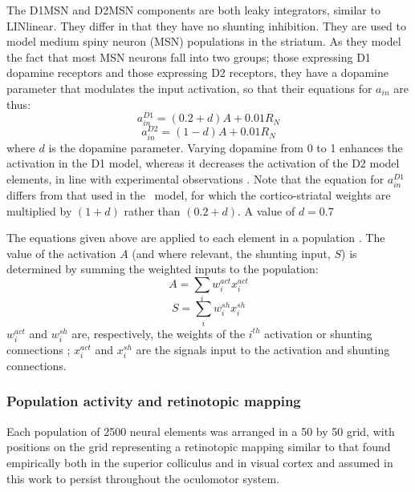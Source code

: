 \documentclass{frontiersSCNS}
\begin{document}
The D1MSN and D2MSN components are both leaky integrators, similar to
LINlinear. They differ in that they have no shunting inhibition. They
are used to model medium spiny neuron (MSN) populations in the
striatum. As they model the fact that most MSN neurons fall into two
groups; those expressing D1 dopamine receptors and those expressing D2
receptors, they have a dopamine parameter that modulates the input
activation, so that their equations for $a_{in}$ are thus:
\begin{equation} \label{eq:a_in_d1}
   a_{in}^{D1} = (0.2 + d)A + 0.01 R_N
\end{equation}
\begin{equation} \label{eq:a_in_d2}
   a_{in}^{D2} = (1 - d)A + 0.01 R_N
\end{equation}
where $d$ is the dopamine parameter. Varying dopamine from 0 to 1
enhances the activation in the D1 model, whereas it decreases the
activation of the D2 model elements, in line with experimental
observations \citep{harsing_influence_1997,gonon_prolonged_1997}.
Note that the equation for $a_{in}^{D1}$ differs from that used in
the \ccg~model, for which the cortico-striatal weights are multiplied
by $(1+d)$ rather than $(0.2+d)$. A value of $d=$0.7

The equations given above are applied to each element in a population
. The value of the activation
$A$ (and where relevant, the shunting input, $S$) is determined by
summing the weighted inputs to the population:
\begin{equation}
A = \sum_{i}w_i^{act} x_i^{act}
\end{equation}
\begin{equation}
S = \sum_{i}w_i^{sh} x_i^{sh}
\end{equation}
$w_i^{act}$ and $w_i^{sh}$ are, respectively, the weights of the
$i^{th}$ activation or shunting connections ;
$x_i^{act}$ and $x_i^{sh}$ are the signals input to the activation and
shunting connections.

\subsubsection{Population activity and retinotopic mapping}
\label{sec:mapping}

Each population of 2500 neural elements was arranged in a 50 by 50
grid, with positions on the grid representing a retinotopic mapping
similar to that found empirically both in the superior
colliculus \citep{ottes_visuomotor_1986} and in visual cortex
\citep{eric_l._schwartz_computational_1980}
and assumed in this work to persist throughout the oculomotor system.
\end{document}
